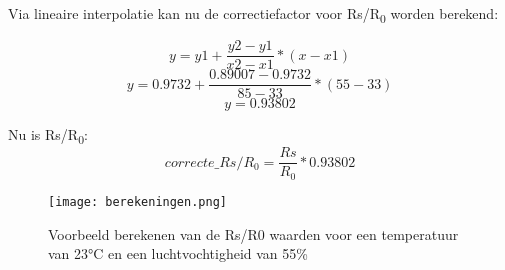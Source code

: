 Via lineaire interpolatie \autocite{lin2016} kan nu de correctiefactor voor Rs/R\textsubscript{0} worden berekend:

\begin{equation}
    y = y1 + \frac{y2 - y1}{x2 - x1}*(x - x1)
\end{equation}
\begin{equation}
    y = 0.9732 + \frac{0.89007 - 0.9732}{85 - 33}*(55 - 33)
\end{equation}
\begin{equation}
    y = 0.93802
\end{equation}

Nu is Rs/R\textsubscript{0}:
\begin{equation}
    correcte\_Rs/R_0 = \frac{Rs}{R_0} * 0.93802
\end{equation}


\begin{figure}[h]
    \texttt{[image: berekeningen.png]}
    \caption[Voorbeeld berekenen Rs/R0 met temperatuur = 23°C en luchtvochtigheid = 55\%]{Voorbeeld berekenen van de Rs/R0 waarden voor een temperatuur van 23°C en een luchtvochtigheid van 55\%}
    \label{fig:berekeningen}
\end{figure}


